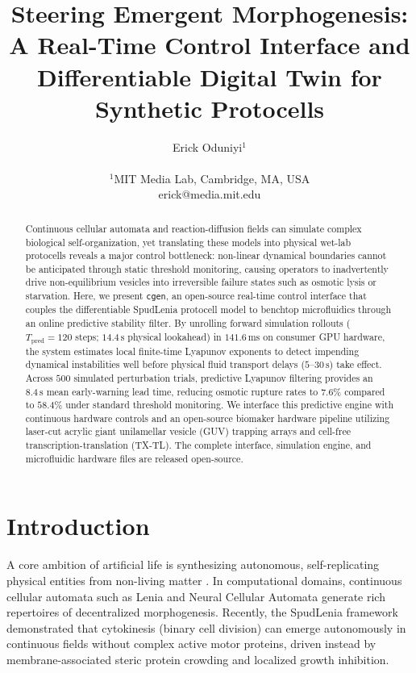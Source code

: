 \documentclass[letterpaper]{article}
\title{Steering Emergent Morphogenesis: A Real-Time Control Interface and Differentiable Digital Twin for Synthetic Protocells}
\author{Erick Oduniyi$^{1}$ \\
\mbox{} \\
$^1$MIT Media Lab, Cambridge, MA, USA \\
erick@media.mit.edu}
\begin{document}
\maketitle

\begin{abstract}
Continuous cellular automata and reaction-diffusion fields can simulate complex biological self-organization, yet translating these models into physical wet-lab protocells reveals a major control bottleneck: non-linear dynamical boundaries cannot be anticipated through static threshold monitoring, causing operators to inadvertently drive non-equilibrium vesicles into irreversible failure states such as osmotic lysis or starvation. Here, we present \texttt{cgen}, an open-source real-time control interface that couples the differentiable SpudLenia protocell model to benchtop microfluidics through an online predictive stability filter. By unrolling forward simulation rollouts ($T_{\text{pred}} = 120$ steps; $14.4\,\text{s}$ physical lookahead) in $141.6\,\text{ms}$ on consumer GPU hardware, the system estimates local finite-time Lyapunov exponents to detect impending dynamical instabilities well before physical fluid transport delays ($5\text{--}30\,\text{s}$) take effect. Across $500$ simulated perturbation trials, predictive Lyapunov filtering provides an $8.4\,\text{s}$ mean early-warning lead time, reducing osmotic rupture rates to $7.6\%$ compared to $58.4\%$ under standard threshold monitoring. We interface this predictive engine with continuous hardware controls and an open-source biomaker hardware pipeline utilizing laser-cut acrylic giant unilamellar vesicle (GUV) trapping arrays and cell-free transcription-translation (TX-TL). The complete interface, simulation engine, and microfluidic hardware files are released open-source.
\end{abstract}

\section{Introduction}

A core ambition of artificial life is synthesizing autonomous, self-replicating physical entities from non-living matter \citep{rasmussen2004transitions,adamala2026spudcell}. In computational domains, continuous cellular automata such as Lenia \citep{chan2019lenia,chan2020lenia} and Neural Cellular Automata \citep{mordvintsev2020growing,niklasson2021asynchronous} generate rich repertoires of decentralized morphogenesis. Recently, the SpudLenia framework \citep{oduniyi2026spudlenia} demonstrated that cytokinesis (binary cell division) can emerge autonomously in continuous fields without complex active motor proteins, driven instead by membrane-associated steric protein crowding and localized growth inhibition.
\end{document}
